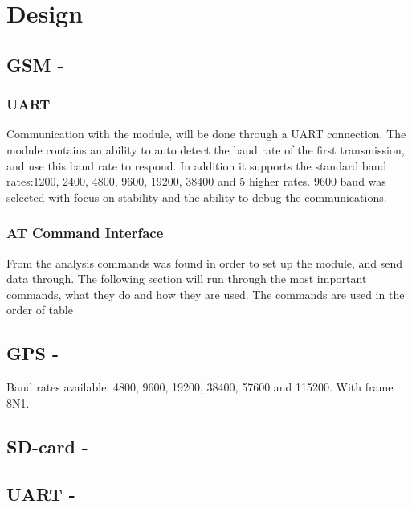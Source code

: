 
\chapter{Design}
\label{ch:Design}

\section{GSM - \SARA}

\subsection{UART}
Communication with the \SARA module, will be done through a UART connection. The module contains an ability to auto detect the baud rate of the first transmission, and use this baud rate to respond. In addition it supports the standard baud rates:\num{1200}, \num{2400}, \num{4800}, \num{9600}, \num{19200}, \num{38400} and 5 higher rates. \num{9600} baud was selected with focus on stability and the ability to debug the communications.

\subsection{AT Command Interface}
From the analysis commands was found in order to set up the module, and send data through. The following section will run through the most important commands, what they do and how they are used. The commands are used in the order of table 



\section{GPS - \GPS}
Baud rates available: \num{4800}, \num{9600}, \num{19200}, \num{38400}, \num{57600} and \num{115200}. With frame 8N1.

\cite{MKRSchem}

\section{SD-card - \SDsock}


\section{UART - \SAMD}

